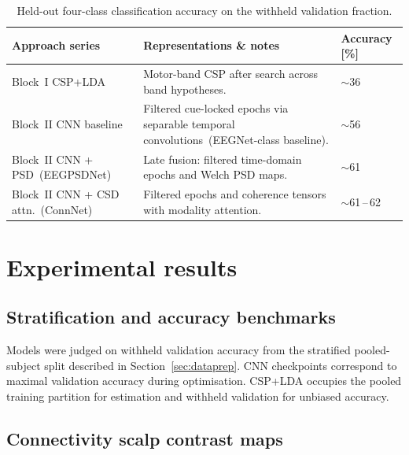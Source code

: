 \begin{table}[!b]
  \centering
  \begingroup
  \captionsetup{font=normalsize}
  \caption{Held-out four-class classification accuracy on the withheld validation fraction.}
  \label{tab:main}
  \normalsize
  \setlength{\tabcolsep}{14pt}
  \renewcommand{\arraystretch}{1.55}
  \begin{tabularx}{\textwidth}{@{} >{\raggedright\arraybackslash}p{3.05cm} >{\raggedright\arraybackslash}X >{\centering\arraybackslash}p{2.05cm} @{}}
    \toprule
    \textbf{Approach series} & \textbf{Representations \& notes} & \textbf{Accuracy [\%]} \\
    \midrule
    Block~I CSP+LDA~\cite{gramfort2013meg} &
      Motor-band CSP after search across band hypotheses. &
      \(\sim\)36 \\
    Block~II CNN baseline~\cite{lawhern2018eegnet} &
      Filtered cue-locked epochs via separable temporal convolutions~(EEGNet-class baseline). &
      \(\sim\)56 \\
    Block~II CNN + PSD~(EEGPSDNet) &
      Late fusion: filtered time-domain epochs and Welch PSD maps. &
      \(\sim\)61 \\
    Block~II CNN + CSD attn.~(ConnNet) &
      Filtered epochs and coherence tensors with modality attention. &
      \(\sim\)61\,--\,62 \\
    \bottomrule
  \end{tabularx}
  \endgroup
\end{table}

\section{Experimental results}
\label{sec:results}

\subsection{Stratification and accuracy benchmarks}

\label{sec:accuracy}
Models were judged on withheld validation accuracy from the stratified pooled-subject split described in Section~\ref{sec:dataprep}.
CNN checkpoints correspond to maximal validation accuracy during optimisation.
CSP+LDA occupies the pooled training partition for estimation and withheld validation for unbiased accuracy.



\subsection{Connectivity scalp contrast maps}

